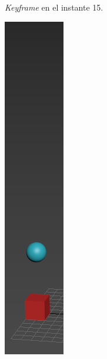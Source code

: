 \documentclass{article}
\begin{document}
\begin{figure}[H]
\begin{subfigure}[H]{0.15\textwidth}
	    \caption{\textit{Keyframe} en el instante 15.}
	\end{subfigure}
    \hfill
	\begin{subfigure}[H]{0.15\textwidth}
	    \centering
	    \includegraphics[width=\textwidth]{imagenes/p1_ins40.png}

\end{subfigure}
\end{figure}
\end{document}
